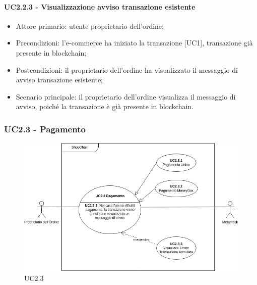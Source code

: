 \paragraph{UC2.2.3 - Visualizzazione avviso transazione esistente}

\begin{itemize}
    \item Attore primario: utente proprietario dell'ordine;
    \item Precondizioni: l'e-commerce\glo{} ha iniziato la transazione [UC1], transazione già presente in blockchain;
    \item Postcondizioni: il proprietario dell'ordine ha visualizzato il messaggio di avviso transazione esistente;
    \item Scenario principale: il proprietario dell'ordine visualizza il messaggio di avviso, poiché la transazione è già presente in blockchain\glo{}.
\end{itemize}

\subsubsection{UC2.3 - Pagamento}

\begin{figure}[H]
    \centering
    \includegraphics[scale=0.7]{immagini/UC2.3.png}
    \caption{UC2.3}
\end{figure}

